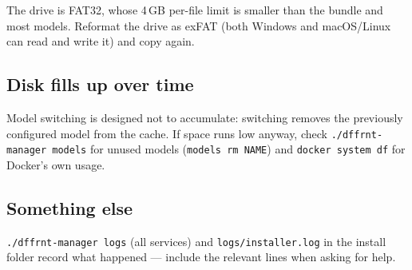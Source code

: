 \documentclass[11pt,letterpaper]{article}
\begin{document}
The drive is FAT32, whose 4\,GB per-file limit is smaller than the bundle and
most models. Reformat the drive as exFAT (both Windows and macOS/Linux can
read and write it) and copy again.

\subsection{Disk fills up over time}

Model switching is designed not to accumulate: switching removes the
previously configured model from the cache. If space runs low anyway, check
\texttt{./dffrnt-manager models} for unused models (\texttt{models rm NAME})
and \texttt{docker system df} for Docker's own usage.

\subsection{Something else}

\texttt{./dffrnt-manager logs} (all services) and
\texttt{logs/installer.log} in the install folder record what happened ---
include the relevant lines when asking for help.
\end{document}
